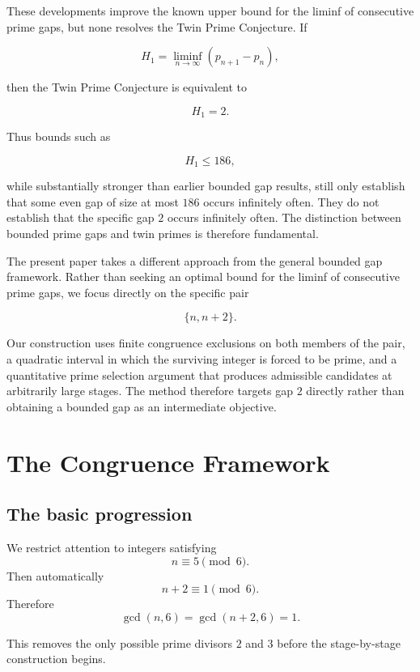 \documentclass[11pt,a4paper]{article}
\theoremstyle{definition}
\theoremstyle{remark}
\begin{document}
These developments improve the known upper bound for the liminf of
consecutive prime gaps, but none resolves the Twin Prime Conjecture.
If

$$
    H_1=\liminf_{n\to\infty}(p_{n+1}-p_n),
$$

then the Twin Prime Conjecture is equivalent to

$$
    H_1=2.
$$

Thus bounds such as

$$
    H_1\le186,
$$

while substantially stronger than earlier bounded gap results, still
only establish that some even gap of size at most $186$ occurs
infinitely often.  They do not establish that the specific gap $2$
occurs infinitely often.  The distinction between bounded prime gaps
and twin primes is therefore fundamental.

The present paper takes a different approach from the general
bounded gap framework.  Rather than seeking an optimal bound for the
liminf of consecutive prime gaps, we focus directly on the specific
pair

$$
    \{n,n+2\}.
$$

Our construction uses finite congruence exclusions on both members of
the pair, a quadratic interval in which the surviving integer is
forced to be prime, and a quantitative prime selection argument that
produces admissible candidates at arbitrarily large stages.  The method
therefore targets gap $2$ directly rather than obtaining a bounded gap
as an intermediate objective.





\section{The Congruence Framework}

\subsection{The basic progression}

We restrict attention to integers satisfying
\[
    n\equiv5\pmod6.
\]
Then automatically
\[
    n+2\equiv1\pmod6.
\]
Therefore
\[
    \gcd(n,6)=\gcd(n+2,6)=1.
\]

This removes the only possible prime divisors $2$ and $3$ before the
stage-by-stage construction begins.
\end{document}
